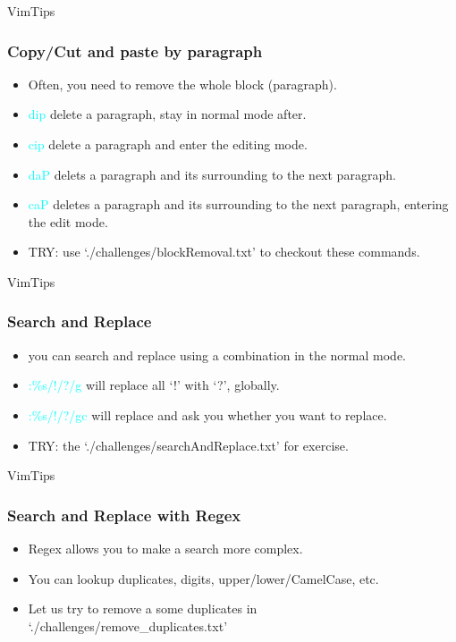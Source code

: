 \documentclass{beamer}
\newcommand{\highlight}[1]{\textcolor{cyan}{\textsf{#1}}}
\begin{document}
\begin{frame}{VimTips}
    \frametitle{Copy/Cut and paste by paragraph}
    \begin{itemize}
        \item Often, you need to remove the whole block (paragraph).
        \item \highlight{dip} delete a \textsf{p}aragraph, stay in normal mode after.
        \item \highlight{cip} delete a \textsf{p}aragraph and enter the editing mode.
        \item \highlight{daP} delets a \textsf{p}aragraph and its surrounding to the next paragraph.
        \item \highlight{caP} deletes a \textsf{p}aragraph and its surrounding to the next paragraph, entering the edit mode.
        \item TRY: use `./challenges/blockRemoval.txt' to checkout these commands.
    \end{itemize}
\end{frame}

\begin{frame}{VimTips}
    \frametitle{Search and Replace}
    \begin{itemize}
        \item you can search and replace using a combination in the normal mode.
        \item \highlight{:\%s/!/?/g} will replace all `!' with `?', globally.
        \item \highlight{:\%s/!/?/gc} will replace and ask you whether you want to replace.
        \item TRY: the `./challenges/searchAndReplace.txt' for exercise.
    \end{itemize}
\end{frame}

\begin{frame}{VimTips}
    \frametitle{Search and Replace with Regex}
    \begin{itemize}
        \item Regex allows you to make a search more complex.
        \item You can lookup duplicates, digits, upper/lower/CamelCase, etc.
        \item Let us try to remove a some duplicates in `./challenges/remove\_duplicates.txt'
    \end{itemize}
\end{frame}
\end{document}
